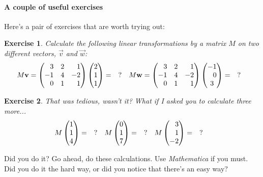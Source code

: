 \documentclass[12pt]{article}
\newtheorem{exercise}{Exercise}[section]
\begin{document}
\paragraph{A couple of useful exercises}
Here's a pair of exercises that are worth trying out:
\begin{exercise}
Calculate the following linear transformations by a matrix $M$ on two different vectors, $\vec{v}$ and $\vec{w}$:
\begin{align}
    M\vec{v} &= 
    \begin{pmatrix}
        \pp 3 & 2 & \pp 1 \\
        - 1 & 4 & -2 \\
        \pp 0 & 1 & \pp 1
    \end{pmatrix}
    \begin{pmatrix}
        2 \\ 1 \\ 1
    \end{pmatrix}
    = \quad ?
    &
    M\vec{w} &= 
    \begin{pmatrix}
        \pp 3 & 2 & \pp 1 \\
        - 1 & 4 & -2 \\
        \pp 0 & 1 & \pp 1
    \end{pmatrix}
    \begin{pmatrix}
        -1 \\ \pp 0 \\ 3
    \end{pmatrix}
    = \quad ?
\end{align}
\end{exercise}
\begin{exercise}
That was tedious, wasn't it? What if I asked you to calculate three more...
\begin{align}
    M
    \begin{pmatrix}
        1 \\ 1 \\ 4
    \end{pmatrix}
    &= \quad ?
    &
    M
    \begin{pmatrix}
        0 \\ 1 \\ 7
    \end{pmatrix}
    &= \quad ?
    &
    M
    \begin{pmatrix}
        \pp 3 \\ \pp 1 \\ -2
    \end{pmatrix}
    &= \quad ?
    \label{eq:eg:more:multiplications}
\end{align}
\end{exercise}
Did you do it? Go ahead, do these calculations. Use \emph{Mathematica} if you must. Did you do it the hard way, or did you notice that there's an easy way? 
\end{document}
